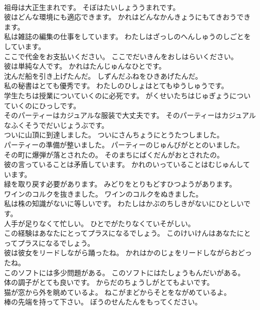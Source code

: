 \documentclass[8pt]{extreport}
\begin{document}
\begin{CJK}{UTF8}{min}
\\	祖母は大正生まれです。	そぼはたいしょううまれです。 
\\	彼はどんな環境にも適応できます。	かれはどんなかんきょうにもてきおうできます。 
\\	私は雑誌の編集の仕事をしています。	わたしはざっしのへんしゅうのしごとをしています。 
\\	ここで代金をお支払いください。	ここでだいきんをおしはらいください。 
\\	彼は単純な人です。	かれはたんじゅんなひとです。 
\\	沈んだ船を引き上げたんだ。	しずんだふねをひきあげたんだ。 
\\	私の秘書はとても優秀です。	わたしのひしょはとてもゆうしゅうです。 
\\	学生たちは授業についていくのに必死です。	がくせいたちはじゅぎょうについていくのにひっしです。 
\\	そのパーティーはカジュアルな服装で大丈夫です。	そのパーティーはカジュアルなふくそうでだいじょうぶです。 
\\	ついに山頂に到達しました。	ついにさんちょうにとうたつしました。 
\\	パーティーの準備が整いました。	パーティーのじゅんびがととのいました。 
\\	その町に爆弾が落とされたの。	そのまちにばくだんがおとされたの。 
\\	彼の言っていることは矛盾しています。	かれのいっていることはむじゅんしています。 
\\	緑を取り戻す必要があります。	みどりをとりもどすひつようがあります。 
\\	ワインのコルクを抜きました。	ワインのコルクをぬきました。 
\\	私は株の知識がないに等しいです。	わたしはかぶのちしきがないにひとしいです。 
\\	人手が足りなくて忙しい。	ひとでがたりなくていそがしい。 
\\	この経験はあなたにとってプラスになるでしょう。	このけいけんはあなたにとってプラスになるでしょう。 
\\	彼は彼女をリードしながら踊ったね。	かれはかのじょをリードしながらおどったね。 
\\	このソフトには多少問題がある。	このソフトにはたしょうもんだいがある。 
\\	体の調子がとても良いです。	からだのちょうしがとてもよいです。 
\\	猫が窓から外を眺めているよ。	ねこがまどからそとをながめているよ。 
\\	棒の先端を持って下さい。	ぼうのせんたんをもってください。 

\end{CJK}
\end{document}
